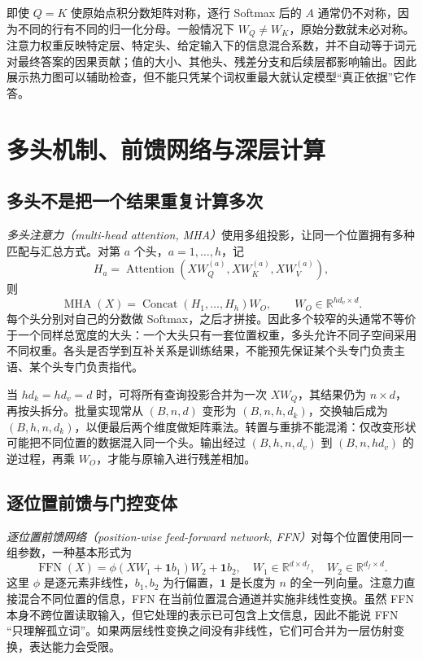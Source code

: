\documentclass[UTF8,12pt,a4paper,fontset=fandol]{ctexart}
\begin{document}
即使 $Q=K$ 使原始点积分数矩阵对称，逐行 Softmax 后的 $A$ 通常仍不对称，因为不同的行有不同的归一化分母。一般情况下 $W_Q\ne W_K$，原始分数就未必对称。注意力权重反映特定层、特定头、给定输入下的信息混合系数，并不自动等于词元对最终答案的因果贡献；值的大小、其他头、残差分支和后续层都影响输出。因此展示热力图可以辅助检查，但不能只凭某个词权重最大就认定模型“真正依据”它作答。

\section{多头机制、前馈网络与深层计算}
\label{sec:tr-block}

\subsection{多头不是把一个结果重复计算多次}

\emph{多头注意力（multi-head attention, MHA）}使用多组投影，让同一个位置拥有多种匹配与汇总方式。对第 $a$ 个头，$a=1,\ldots,h$，记
\[
H_a=\operatorname{Attention}(XW_Q^{(a)},XW_K^{(a)},XW_V^{(a)}),
\]
则
\begin{equation}
\operatorname{MHA}(X)=\operatorname{Concat}(H_1,\ldots,H_h)W_O,
\qquad W_O\in\mathbb R^{hd_v\times d}.
\label{eq:tr-mha}
\end{equation}
每个头分别对自己的分数做 Softmax，之后才拼接。因此多个较窄的头通常不等价于一个同样总宽度的大头：一个大头只有一套位置权重，多头允许不同子空间采用不同权重。各头是否学到互补关系是训练结果，不能预先保证某个头专门负责主语、某个头专门负责指代。

当 $hd_k=hd_v=d$ 时，可将所有查询投影合并为一次 $XW_Q$，其结果仍为 $n\times d$，再按头拆分。批量实现常从 $(B,n,d)$ 变形为 $(B,n,h,d_k)$，交换轴后成为 $(B,h,n,d_k)$，以便最后两个维度做矩阵乘法。转置与重排不能混淆：仅改变形状可能把不同位置的数据混入同一个头。输出经过 $(B,h,n,d_v)$ 到 $(B,n,hd_v)$ 的逆过程，再乘 $W_O$，才能与原输入进行残差相加。

\subsection{逐位置前馈与门控变体}

\emph{逐位置前馈网络（position-wise feed-forward network, FFN）}对每个位置使用同一组参数，一种基本形式为
\begin{equation}
\operatorname{FFN}(X)=\phi(XW_1+\mathbf1b_1)W_2+\mathbf1b_2,
\quad W_1\in\mathbb R^{d\times d_f},\quad W_2\in\mathbb R^{d_f\times d}.
\label{eq:tr-ffn}
\end{equation}
这里 $\phi$ 是逐元素非线性，$b_1,b_2$ 为行偏置，$\mathbf1$ 是长度为 $n$ 的全一列向量。注意力直接混合不同位置的信息，FFN 在当前位置混合通道并实施非线性变换。虽然 FFN 本身不跨位置读取输入，但它处理的表示已可包含上文信息，因此不能说 FFN “只理解孤立词”。如果两层线性变换之间没有非线性，它们可合并为一层仿射变换，表达能力会受限。
\end{document}
